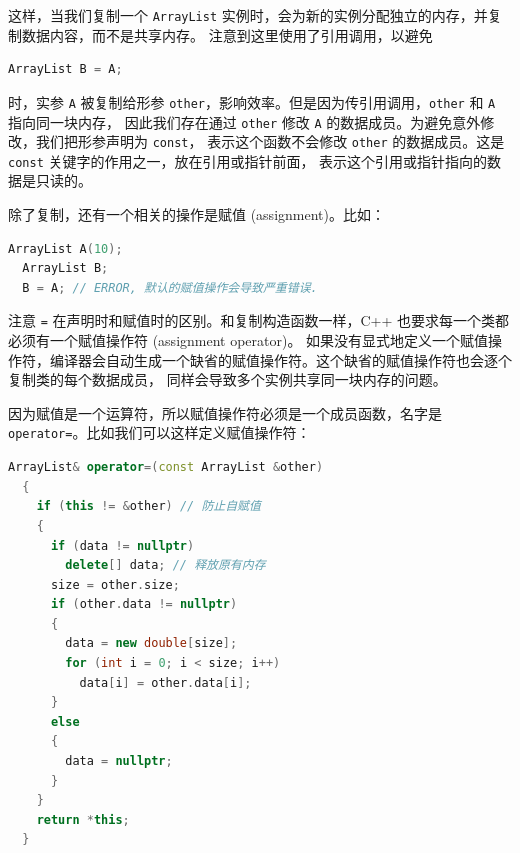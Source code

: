 \documentclass[a4paper]{ctexart}
\theoremstyle{definition}
\theoremstyle{definition}
\begin{document}
这样，当我们复制一个 \verb|ArrayList| 实例时，会为新的实例分配独立的内存，并复制数据内容，而不是共享内存。
注意到这里使用了引用调用，以避免 
\begin{lstlisting}[language=C++]
  ArrayList B = A; 
\end{lstlisting}
时，实参 \verb|A| 被复制给形参 \verb|other|，影响效率。但是因为传引用调用，\verb|other| 和 \verb|A| 指向同一块内存，
因此我们存在通过 \verb|other| 修改 \verb|A| 的数据成员。为避免意外修改，我们把形参声明为 \verb|const|，
表示这个函数不会修改 \verb|other| 的数据成员。这是 \verb|const| 关键字的作用之一，放在引用或指针前面，
表示这个引用或指针指向的数据是只读的。

除了复制，还有一个相关的操作是赋值 (assignment)。比如：
\begin{lstlisting}[language=C++]
  ArrayList A(10);
  ArrayList B;
  B = A; // ERROR, 默认的赋值操作会导致严重错误.
\end{lstlisting}
注意 \verb|=| 在声明时和赋值时的区别。和复制构造函数一样，C++ 也要求每一个类都必须有一个赋值操作符 (assignment operator)。
如果没有显式地定义一个赋值操作符，编译器会自动生成一个缺省的赋值操作符。这个缺省的赋值操作符也会逐个复制类的每个数据成员，
同样会导致多个实例共享同一块内存的问题。

因为赋值是一个运算符，所以赋值操作符必须是一个成员函数，名字是 \verb|operator=|。比如我们可以这样定义赋值操作符：
\begin{lstlisting}[language=C++]
  ArrayList& operator=(const ArrayList &other)
  {
    if (this != &other) // 防止自赋值
    {
      if (data != nullptr)
        delete[] data; // 释放原有内存
      size = other.size;
      if (other.data != nullptr)
      {
        data = new double[size];
        for (int i = 0; i < size; i++)
          data[i] = other.data[i];
      }
      else
      {
        data = nullptr;
      }
    }
    return *this;
  }
\end{lstlisting}
\end{document}
